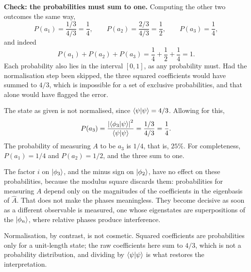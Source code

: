 \documentclass[12pt]{article}
\begin{document}
\begin{solutionbox}
\textbf{Check: the probabilities must sum to one.} Computing the other two outcomes the same way,
\[
    P(a_{1})=\frac{1/3}{4/3}=\frac{1}{4},
    \qquad
    P(a_{2})=\frac{2/3}{4/3}=\frac{1}{2},
    \qquad
    P(a_{3})=\frac{1}{4},
\]
and indeed
\[
    P(a_{1})+P(a_{2})+P(a_{3})=\frac{1}{4}+\frac{1}{2}+\frac{1}{4}=1 .
\]
Each probability also lies in the interval $[0,1]$, as any probability must. Had the normalisation step been skipped, the three squared coefficients would have summed to $4/3$, which is impossible for a set of exclusive probabilities, and that alone would have flagged the error.
\end{solutionbox}

\begin{answerbox}
The state as given is not normalised, since $\braket{\psi|\psi}=4/3$. Allowing for this,
\[
    P(a_{3})=\frac{\left|\braket{\phi_{3}|\psi}\right|^{2}}{\braket{\psi|\psi}}
    =\frac{1/3}{4/3}=\frac{1}{4} .
\]
The probability of measuring $A$ to be $a_{3}$ is $1/4$, that is, $25\%$. For completeness, $P(a_{1})=1/4$ and $P(a_{2})=1/2$, and the three sum to one.
\end{answerbox}

\begin{insightbox}
The factor $i$ on $\ket{\phi_{3}}$, and the minus sign on $\ket{\phi_{2}}$, have no effect on these probabilities, because the modulus square discards them: probabilities for measuring $A$ depend only on the magnitudes of the coefficients in the eigenbasis of $\hat{A}$. That does not make the phases meaningless. They become decisive as soon as a different observable is measured, one whose eigenstates are superpositions of the $\ket{\phi_{n}}$, where relative phases produce interference.

Normalisation, by contrast, is not cosmetic. Squared coefficients are probabilities only for a unit-length state; the raw coefficients here sum to $4/3$, which is not a probability distribution, and dividing by $\braket{\psi|\psi}$ is what restores the interpretation.
\end{insightbox}
\fi

\newpage
\end{document}
